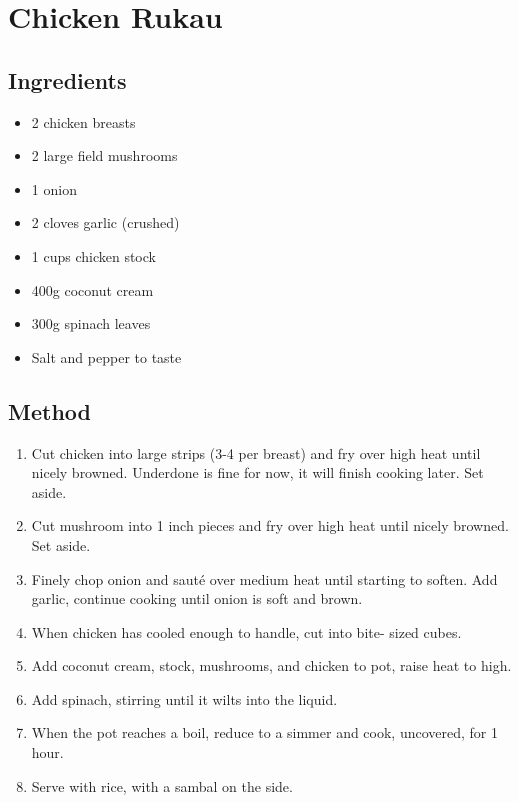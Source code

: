 \section{Chicken Rukau}

  
\subsection{Ingredients}

\begin{itemize}
    \item 2 chicken breasts
    \item 2 large field mushrooms
    \item 1 onion
    \item 2 cloves garlic (crushed)
    \item 1 cups chicken stock
    \item 400g coconut cream
    \item 300g spinach leaves
    \item Salt and pepper to taste
\end{itemize}

\subsection{Method}

\begin{enumerate}
    \item Cut chicken into large strips (3-4 per breast) and fry over
    high heat until nicely browned. Underdone is fine for now, it
    will finish cooking later. Set aside.
    \item Cut mushroom into 1 inch pieces and fry over high heat until
    nicely browned. Set aside.
    \item Finely chop onion and sauté over medium heat until starting
    to soften. Add garlic, continue cooking until onion is soft and
    brown.
    \item When chicken has cooled enough to handle, cut into bite-
    sized cubes.
    \item Add coconut cream, stock, mushrooms, and chicken to pot,
    raise heat to high.
    \item Add spinach, stirring until it wilts into the liquid.
    \item When the pot reaches a boil, reduce to a simmer and cook,
    uncovered, for 1 hour.
    \item Serve with rice, with a sambal on the side.
\end{enumerate}